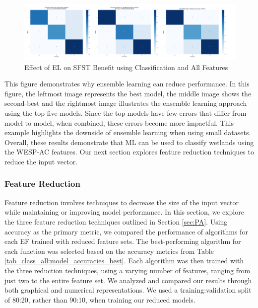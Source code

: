 \documentclass[12pt,letterpaper]{article}
\begin{document}
\begin{figure}
    \centering
    \includegraphics[width=0.95\linewidth]{class_all_section/top_2_and_ensemble_confusion_matrices_SFST_Benefit.png}
    \caption{Effect of EL on SFST Benefit using Classification and All Features}
    \label{fig_class_all:EL_SFST}
\end{figure}

This figure demonstrates why ensemble learning can reduce performance. 
In this figure, the leftmost image represents the best model, the middle image shows the second-best and the rightmost image illustrates the ensemble learning approach using the top five models. 
Since the top models have few errors that differ from model to model, when combined, these errors become more impactful. 
This example highlights the downside of ensemble learning when using small datasets. 
Overall, these results demonstrate that \ac{ML} can be used to classify wetlands using the \ac{WESP-AC} features. 
Our next section explores feature reduction techniques to reduce the input vector.

\subsubsection{Feature Reduction}\label{sec:class_all_featred}
Feature reduction involves techniques to decrease the size of the input vector while maintaining or improving model performance.
In this section, we explore the three feature reduction techniques outlined in Section \ref{sec:PA}.
Using accuracy as the primary metric, we compared the performance of algorithms for each \ac{EF} trained with reduced feature sets.
The best-performing algorithm for each function was selected based on the accuracy metrics from Table \ref{tab_class_all:model_accuracies_best}.
Each algorithm was then trained with the three reduction techniques, using a varying number of features, ranging from just two to the entire feature set.
We analyzed and compared our results through both graphical and numerical representations.
We used a training:validation split of 80:20, rather than 90:10, when training our reduced models.
\end{document}

